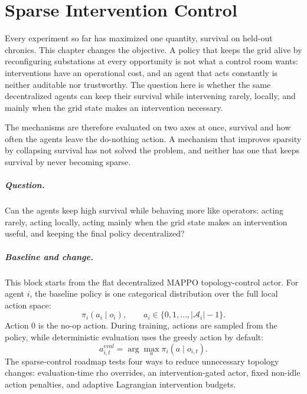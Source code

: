 \chapter{Sparse Intervention Control}
\label{ch:sparse-control}

Every experiment so far has maximized one quantity, survival on held-out
chronics. This chapter changes the objective. A policy that keeps the grid
alive by reconfiguring substations at every opportunity is not what a control
room wants: interventions have an operational cost, and an agent that acts
constantly is neither auditable nor trustworthy. The question here is whether
the same decentralized agents can keep their survival while intervening rarely,
locally, and mainly when the grid state makes an intervention necessary.

The mechanisms are therefore evaluated on two axes at once, survival and how
often the agents leave the do-nothing action. A mechanism that improves
sparsity by collapsing survival has not solved the problem, and neither has one
that keeps survival by never becoming sparse.


\paragraph{Question.}
Can the agents keep high survival while behaving more like operators: acting
rarely, acting locally, acting mainly when the grid state makes an intervention
useful, and keeping the final policy decentralized?

\paragraph{Baseline and change.}
This block starts from the flat decentralized MAPPO topology-control actor. For
agent \(i\), the baseline policy is one categorical distribution over the full
local action space:
\[
  \pi_i(a_i \mid o_i),
  \qquad
  a_i \in \{0,1,\ldots,|\mathcal A_i|-1\}.
\]
Action \(0\) is the no-op action. During training, actions are sampled from the
policy, while deterministic evaluation uses the greedy action by default:
\[
  a_{i,t}^{eval}=\arg\max_a \pi_i(a\mid o_{i,t}).
\]
The sparse-control roadmap tests four ways to reduce unnecessary topology
changes: evaluation-time rho overrides, an intervention-gated actor, fixed
non-idle action penalties, and adaptive Lagrangian intervention budgets.

